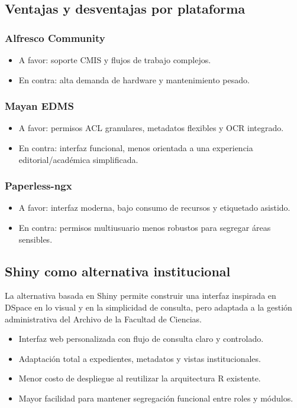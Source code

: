 \subsection{Ventajas y desventajas por plataforma}
\subsubsection{Alfresco Community}
\begin{itemize}
  \item A favor: soporte CMIS y flujos de trabajo complejos.
  \item En contra: alta demanda de hardware y mantenimiento pesado.
\end{itemize}

\subsubsection{Mayan EDMS}
\begin{itemize}
  \item A favor: permisos ACL granulares, metadatos flexibles y OCR integrado.
  \item En contra: interfaz funcional, menos orientada a una experiencia editorial/académica simplificada.
\end{itemize}

\subsubsection{Paperless-ngx}
\begin{itemize}
  \item A favor: interfaz moderna, bajo consumo de recursos y etiquetado asistido.
  \item En contra: permisos multiusuario menos robustos para segregar áreas sensibles.
\end{itemize}

\subsection{Shiny como alternativa institucional}
La alternativa basada en Shiny permite construir una interfaz inspirada en DSpace en lo visual y en la simplicidad de consulta, pero adaptada a la gestión administrativa del Archivo de la Facultad de Ciencias.

\begin{itemize}
  \item Interfaz web personalizada con flujo de consulta claro y controlado.
  \item Adaptación total a expedientes, metadatos y vistas institucionales.
  \item Menor costo de despliegue al reutilizar la arquitectura R existente.
  \item Mayor facilidad para mantener segregación funcional entre roles y módulos.
\end{itemize}

